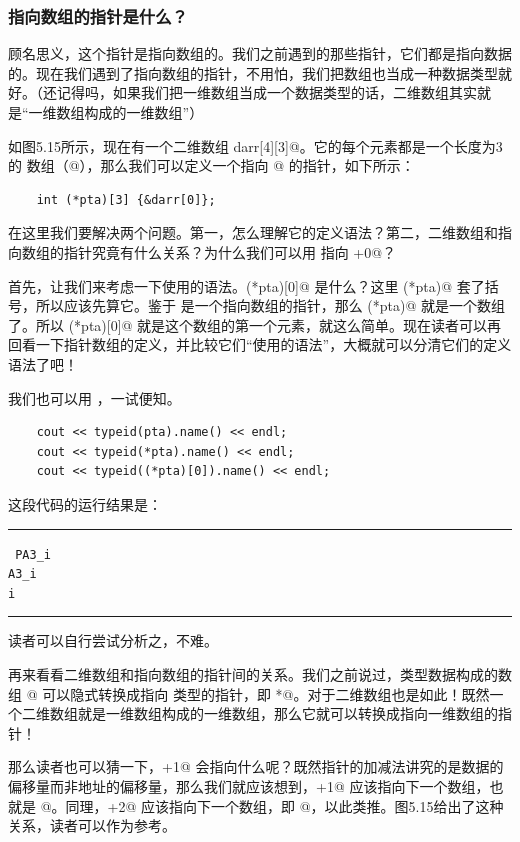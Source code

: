 \subsubsection*{指向数组的指针是什么？}
顾名思义，这个指针是指向数组的。我们之前遇到的那些指针，它们都是指向数据的。现在我们遇到了指向数组的指针，不用怕，我们把数组也当成一种数据类型就好。（还记得吗，如果我们把一维数组当成一个数据类型的话，二维数组其实就是``一维数组构成的一维数组''）\par
如图5.15所示，现在有一个二维数组 \lstinline@int darr[4][3]@。它的每个元素都是一个长度为3的 \lstinline@int@ 数组（\lstinline@int[3]@），那么我们可以定义一个指向 \lstinline@darr[0]@ 的指针，如下所示：
\begin{lstlisting}
    int (*pta)[3] {&darr[0]};
\end{lstlisting}
在这里我们要解决两个问题。第一，怎么理解它的定义语法？第二，二维数组和指向数组的指针究竟有什么关系？为什么我们可以用 \lstinline@pta@ 指向 \lstinline@darr[0]+0@？\par
首先，让我们来考虑一下使用的语法。\lstinline@(*pta)[0]@ 是什么？这里 \lstinline@(*pta)@ 套了括号，所以应该先算它。鉴于 \lstinline@pta@ 是一个指向数组的指针，那么 \lstinline@(*pta)@ 就是一个数组了。所以 \lstinline@(*pta)[0]@ 就是这个数组的第一个元素，就这么简单。现在读者可以再回看一下指针数组的定义，并比较它们``使用的语法''，大概就可以分清它们的定义语法了吧！\par
我们也可以用 \lstinline@typeid@，一试便知。
\begin{lstlisting}
    cout << typeid(pta).name() << endl;
    cout << typeid(*pta).name() << endl;
    cout << typeid((*pta)[0]).name() << endl;
\end{lstlisting}
这段代码的运行结果是：\\\noindent\rule{\linewidth}{.2pt}\texttt{
PA3\_i\\
A3\_i\\
i
}\\\noindent\rule{\linewidth}{.2pt}
读者可以自行尝试分析之，不难。\par
再来看看二维数组和指向数组的指针间的关系。我们之前说过，\lstinline@T@ 类型数据构成的数组 \lstinline@T[N]@ 可以隐式转换成指向 \lstinline@T@ 类型的指针，即 \lstinline@T*@。对于二维数组也是如此！既然一个二维数组就是一维数组构成的一维数组，那么它就可以转换成指向一维数组的指针！\par
那么读者也可以猜一下，\lstinline@pta+1@ 会指向什么呢？既然指针的加减法讲究的是数据的偏移量而非地址的偏移量，那么我们就应该想到，\lstinline@pta+1@ 应该指向下一个数组，也就是 \lstinline@darr[1]@。同理，\lstinline@pta+2@ 应该指向下一个数组，即 \lstinline@darr[2]@，以此类推。图5.15给出了这种关系，读者可以作为参考。\par
